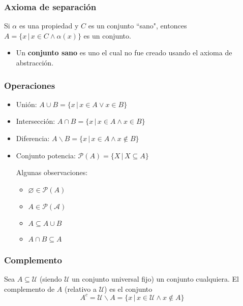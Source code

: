 \begin{multicols}{2}
    \subsubsection*{Axioma de separación}
    Si $\alpha$ es una propiedad y $C$ es un conjunto ``sano", entonces $A = \{x \,|\, x \in C \wedge \alpha(x)\}$ es un conjunto.
    \begin{itemize}
        \item Un \textbf{conjunto sano} es uno el cual no fue creado usando el axioma de abstracción.
    \end{itemize}
    
    \subsubsection*{Operaciones}
    \begin{itemize}
        \item Unión: $A \cup B = \{x \,|\, x \in A \vee x \in B\}$
        \item Intersección: $A \cap B = \{x \,|\, x \in A \wedge x \in B\}$
        \item Diferencia: $A \backslash B = \{x \,|\, x \in A \wedge x \notin B\}$
        \item Conjunto potencia: $\mathcal{P}(A) = \{X \,|\, X \subseteq A\}$ \p
        
        Algunas observaciones:
        \begin{multicols}{2}
            \begin{itemize}
                \item $\varnothing \in \mathcal{P}(A)$
                \item $A \in \mathcal{P(A)}$
                \item $A \subseteq A \cup B$
                \item $A \cap B \subseteq A$
            \end{itemize}
        \end{multicols}
    \end{itemize}
    
    \subsubsection*{Complemento}
    Sea $A \subseteq \mathcal{U}$ (siendo $\mathcal{U}$ un conjunto universal fijo) un conjunto cualquiera. El complemento de $A$ (relativo a $\mathcal{U}$) es el conjunto
        $$
        A^c = \mathcal{U} \backslash A = \{x \,|\, x \in \mathcal{U} \wedge x \notin A\}
        $$
    

\end{multicols}
